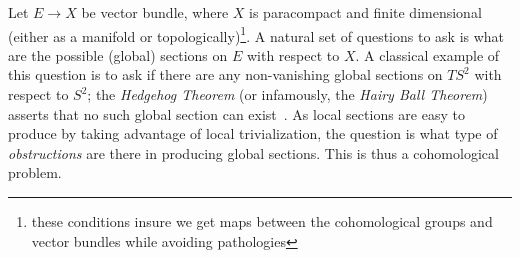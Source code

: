 \documentclass{book}
\begin{document}
Let $E \to X$ be vector bundle, where $X$ is paracompact and finite dimensional (either as a manifold or
topologically)\footnote{these conditions insure we get maps between the cohomological groups and vector
bundles while avoiding pathologies}. A natural set of questions to ask is what are the possible (global)
sections on $E$ with respect to $X$. A classical example of this question is to ask if there are any
non-vanishing global sections on $TS^2$ with respect to $S^2$; the \emph{Hedgehog Theorem} (or infamously, the
\emph{Hairy Ball Theorem}) asserts that no such global section can exist~\cite{NateAlgTop}. As local sections
are easy to produce by taking advantage of local trivialization, the question is what type of
\emph{obstructions} are there in producing global sections. This is thus a cohomological problem.

\end{document}

